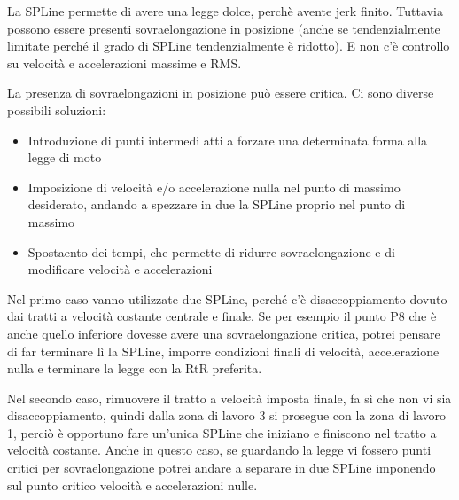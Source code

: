 La SPLine permette di avere una legge dolce, perchè avente jerk finito.
Tuttavia possono essere presenti sovraelongazione in posizione (anche se tendenzialmente limitate perché il grado di SPLine tendenzialmente è ridotto). E non c'è controllo su velocità e accelerazioni massime e RMS.

La presenza di sovraelongazioni in posizione può essere critica.
Ci sono diverse possibili soluzioni:
\begin{itemize}
    \item Introduzione di punti intermedi atti a forzare una determinata forma alla legge di moto
    \item Imposizione di velocità e/o accelerazione nulla nel punto di massimo desiderato, andando a spezzare in due la SPLine proprio nel punto di massimo
    \item Spostaento dei tempi, che permette di ridurre sovraelongazione e di modificare velocità e accelerazioni
\end{itemize}


Nel primo caso vanno utilizzate due SPLine, perché c'è disaccoppiamento dovuto dai tratti a velocità costante centrale e finale. Se per esempio il punto P8 che è anche quello inferiore dovesse avere una sovraelongazione critica, potrei pensare di far terminare lì la SPLine, imporre condizioni finali di velocità, accelerazione nulla e terminare la legge con la RtR preferita.

Nel secondo caso, rimuovere il tratto a velocità imposta finale, fa sì che non vi sia disaccoppiamento, quindi dalla zona di lavoro 3 si prosegue con la zona di lavoro 1, perciò è opportuno fare un'unica SPLine che iniziano e finiscono nel tratto a velocità costante. Anche in questo caso, se guardando la legge vi fossero punti critici per sovraelongazione potrei andare a separare in due SPLine imponendo sul punto critico velocità e accelerazioni nulle.



